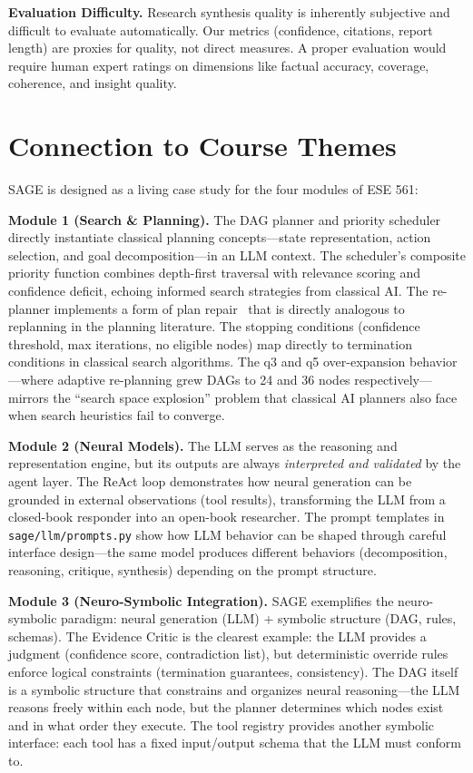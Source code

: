 \documentclass[11pt]{article}
\begin{document}
\textbf{Evaluation Difficulty.} Research synthesis quality is inherently subjective and difficult to evaluate automatically. Our metrics (confidence, citations, report length) are proxies for quality, not direct measures. A proper evaluation would require human expert ratings on dimensions like factual accuracy, coverage, coherence, and insight quality.

\section{Connection to Course Themes}

SAGE is designed as a living case study for the four modules of ESE 561:

\textbf{Module 1 (Search \& Planning).} The DAG planner and priority scheduler directly instantiate classical planning concepts---state representation, action selection, and goal decomposition---in an LLM context. The scheduler's composite priority function combines depth-first traversal with relevance scoring and confidence deficit, echoing informed search strategies from classical AI. The re-planner implements a form of plan repair~\cite{fox2006plan} that is directly analogous to replanning in the planning literature. The stopping conditions (confidence threshold, max iterations, no eligible nodes) map directly to termination conditions in classical search algorithms. The q3 and q5 over-expansion behavior---where adaptive re-planning grew DAGs to 24 and 36 nodes respectively---mirrors the ``search space explosion'' problem that classical AI planners also face when search heuristics fail to converge.

\textbf{Module 2 (Neural Models).} The LLM serves as the reasoning and representation engine, but its outputs are always \emph{interpreted and validated} by the agent layer. The ReAct loop demonstrates how neural generation can be grounded in external observations (tool results), transforming the LLM from a closed-book responder into an open-book researcher. The prompt templates in \texttt{sage/llm/prompts.py} show how LLM behavior can be shaped through careful interface design---the same model produces different behaviors (decomposition, reasoning, critique, synthesis) depending on the prompt structure.

\textbf{Module 3 (Neuro-Symbolic Integration).} SAGE exemplifies the neuro-symbolic paradigm: neural generation (LLM) + symbolic structure (DAG, rules, schemas). The Evidence Critic is the clearest example: the LLM provides a judgment (confidence score, contradiction list), but deterministic override rules enforce logical constraints (termination guarantees, consistency). The DAG itself is a symbolic structure that constrains and organizes neural reasoning---the LLM reasons freely within each node, but the planner determines which nodes exist and in what order they execute. The tool registry provides another symbolic interface: each tool has a fixed input/output schema that the LLM must conform to.
\end{document}
